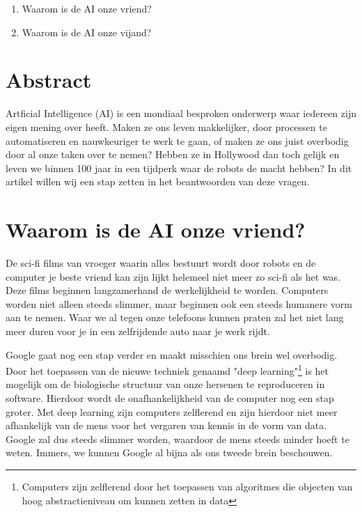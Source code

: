 \documentclass{article}
\begin{document}
\begin{enumerate}
	\item Waarom is de AI onze vriend?
	\item Waarom is de AI onze vijand?
\end{enumerate}  

\newpage
\section{Abstract}
	Artficial Intelligence (AI) is een mondiaal besproken onderwerp waar iedereen zijn eigen mening over heeft. 
	Maken ze ons leven makkelijker, door processen te automatiseren en nauwkeuriger te werk te gaan, of
	maken ze ons juist overbodig door al onze taken over te nemen? Hebben ze in Hollywood dan toch gelijk
	en leven we binnen 100 jaar in een tijdperk waar de robots de macht hebben? In dit artikel willen wij
	een stap zetten in het beantwoorden van deze vragen.

\section{Waarom is de AI onze vriend?}
De sci-fi films van vroeger waarin alles bestuurt wordt door robots en de computer je beste vriend kan zijn
lijkt helemeel niet meer zo sci-fi als het was. Deze films beginnen langzamerhand de werkelijkheid te worden. 
Computers worden niet alleen steeds slimmer, maar beginnen ook een steeds humanere vorm aan te nemen. Waar we 
al tegen onze telefoons kunnen praten zal het niet lang meer duren voor je in een zelfrijdende auto naar je werk rijdt. 

Google gaat nog een stap verder en maakt misschien ons brein wel overbodig. Door het toepassen van de nieuwe techniek genaamd
"deep learning"\footnote{Computers zijn zelflerend door het toepassen van algoritmes die objecten van hoog abstractieniveau
om kunnen zetten in data} is het mogelijk om de biologische structuur van onze hersenen te reproduceren in software.
Hierdoor wordt de onafhankelijkheid van de computer nog een stap groter. Met deep learning zijn computers
zelflerend en zijn hierdoor niet meer afhankelijk van de mens voor het vergaren van kennis in de vorm van data. Google zal
dus steeds slimmer worden, waardoor de mens steeds minder hoeft te weten. Immers, we kunnen Google al bijna als ons
tweede brein beschouwen.\cite{breinoverbodig}
\end{document}
